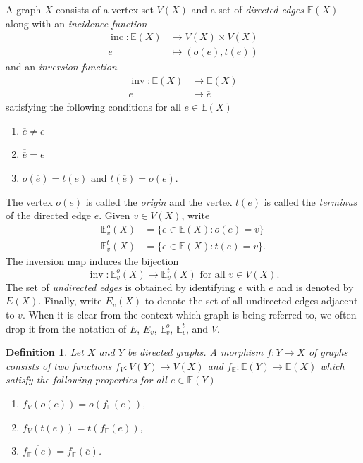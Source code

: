 \documentclass{amsart}
\newtheorem{definition}[theorem]{Definition}
\numberwithin{equation}{section}
\theoremstyle{remark}
\newcommand{\inc}{\operatorname{inc}}
\newcommand{\inv}{\operatorname{inv}}
\newcommand{\E}{\mathbb{E}}
\theoremstyle{plain} %
\begin{document}
A graph $X$ consists of a vertex set $V(X)$ and a set of \emph{directed edges} $\E(X)$ along with an \emph{incidence function} 
\begin{align*}
\inc \colon \E(X) &\longrightarrow V(X) \times V(X)\\
e &\mapsto (o(e), t(e))
\end{align*}
and an \emph{inversion function} 
\begin{align*}
\inv \colon \E(X) &\longrightarrow \E(X)\\
e &\mapsto \overline{e} 
\end{align*}
satisfying the following conditions for all $e \in \E(X)$ 
\begin{enumerate}
\item[(i)] $\overline{e} \neq e$ 
\item[(ii)] $\overline{\overline{e}} = e$
\item[(iii)] $o(\overline{e}) = t(e)$ and $t(\overline{e}) = o(e)$. 
\end{enumerate}
The vertex $o(e)$ is called the \emph{origin} and the vertex $t(e)$ is called the \emph{terminus} of the directed edge $e$.
Given $v \in V(X)$, write 
\begin{align*}
\E^o_v(X) & = \{e \in \E(X) : o(e) =v\}\\
\E^t_v(X) & = \{e \in \E(X) : t(e) =v\}.
\end{align*}
The inversion map induces the bijection 
\[
\inv \colon \E^o_v(X) \longrightarrow \E^t_v(X) \textrm{ for all } v \in V(X).
\]
The set of \emph{undirected edges} is obtained by identifying $e$ with $\overline{e}$ and is denoted by $E(X)$.
Finally, write $E_v(X)$ to denote the set of all undirected edges adjacent to $v$. 
When it is clear from the context which graph is being referred to, we often drop it from the notation of $E$, $E_v$, $\E^o_v$, $\E^t_v$, and $V$.

\begin{definition}
Let $X$ and $Y$ be directed graphs.
A \emph{morphism} $f \colon Y \to X$ of graphs consists of two functions $f_V \colon V(Y) \to V(X)$ and $f_{\E} \colon \E(Y) \to \E(X)$ which satisfy the following properties for all $e \in \E(Y)$
\begin{enumerate}
    \item[\textup{(}i\textup{)}] $f_V(o(e)) = o(f_{\E}(e))$, 
    \item[\textup{(}ii\textup{)}] $f_V(t(e)) = t(f_{\E}(e))$, 
    \item[\textup{(}iii\textup{)}] $\overline{f_{\E}(e)} = f_{\E}(\overline{e})$.
\end{enumerate}
\end{definition}
\end{document}
